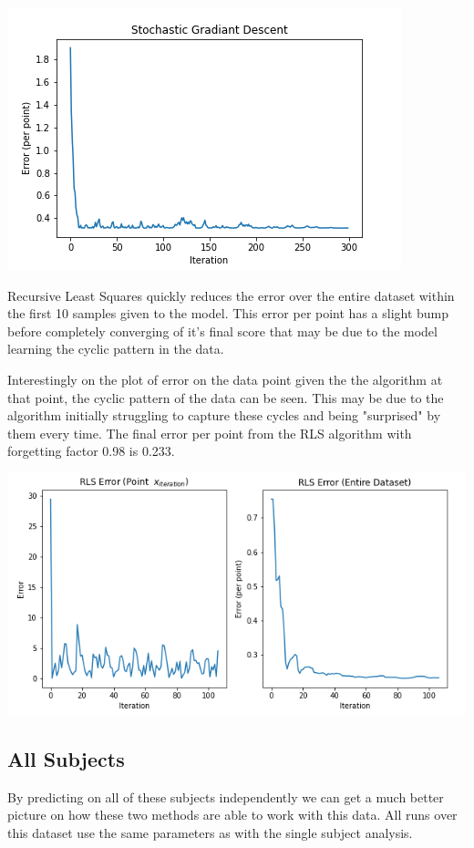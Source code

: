 \includegraphics[width=\linewidth]{figs/Parks SGD single.png}

Recursive Least Squares quickly reduces the error over the entire dataset within the first 10 samples given to the model. This error per point has a slight bump before completely converging of it's final score that may be due to the model learning the cyclic pattern in the data.

Interestingly on the plot of error on the data point given the the algorithm at that point, the cyclic pattern of the data can be seen. This may be due to the algorithm initially struggling to capture these cycles and being "surprised" by them every time.
The final error per point from the RLS algorithm with forgetting factor 0.98 is 0.233.

\includegraphics[width=\linewidth]{figs/Parks RLS single.png}
\subsection{All Subjects}
By predicting on all of these subjects independently we can get a much better picture on how these two methods are able to work with this data.
All runs over this dataset use the same parameters as with the single subject analysis.


